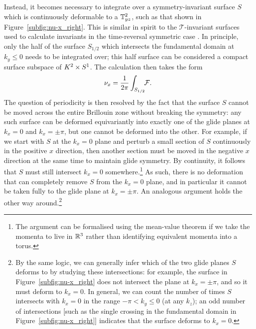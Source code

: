 Instead, it becomes necessary to integrate over a symmetry-invariant surface $S$ which is continuously deformable to a $\mathbb{T}_{yz}^2$, such as that shown in Figure~\ref{subfig:nu-x_right}. This is similar in spirit to the $\mathcal{T}$-invariant surfaces used to calculate invariants in the time-reversal symmetric case \cite{Thiang_equivariant}. In principle, only the half of the surface $S_{1/2}$ which intersects the fundamental domain at $k_y\leq 0$ needs to be integrated over; this half surface can be considered a compact surface subspace of $K^2\times S^1$. The calculation then takes the form
\begin{equation}\label{eq:z-invariant2}
	\nu_x = \frac{1}{2\pi}\int_{S_{1/2}}\!\!\mathcal{F}.
\end{equation}
The question of periodicity is then resolved by the fact that the surface $S$ cannot be moved across the entire Brillouin zone without breaking the symmetry: any such surface can be deformed equivariantly into exactly one of the glide planes at $k_x=0$ and $k_x=\pm\pi$, but one cannot be deformed into the other. For example, if we start with $S$ at the $k_x=0$ plane and perturb a small section of $S$ continuously in the positive $x$ direction, then another section must be moved in the negative $x$ direction at the same time to maintain glide symmetry. By continuity, it follows that $S$ must still intersect $k_x=0$ somewhere.\footnote{
	The argument can be formalised using the mean-value theorem if we take the momenta to live in $\mathbb{R}^3$ rather than identifying equivalent momenta into a torus.}
As such, there is no deformation that can completely remove $S$ from the $k_x=0$ plane, and in particular it cannot be taken fully to the glide plane at $k_x=\pm\pi$. An analogous argument holds the other way around.\footnote{
	By the same logic, we can generally infer which of the two glide planes $S$ deforms to by studying these intersections: for example, the surface in Figure~\ref{subfig:nu-x_right} does not intersect the plane at $k_x=\pm\pi$, and so it must deform to $k_x=0$. In general, we can count the number of times $S$ intersects with $k_x=0$ in the range $-\pi<k_y\leq 0$ (at any $k_z$); an odd number of intersections [such as the single crossing in the fundamental domain in Figure~\ref{subfig:nu-x_right}] indicates that the surface deforms to $k_x=0$.}

